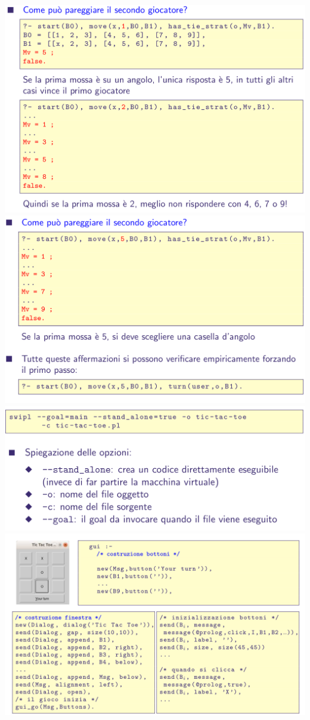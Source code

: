\documentclass[10pt]{article}
\begin{document}
\\
\includegraphics[scale=0.25]{Immagini/pl52.png}
\\
\includegraphics[scale=0.25]{Immagini/pl53.png}
\\
\includegraphics[scale=0.25]{Immagini/pl54.png}
\\
\includegraphics[scale=0.25]{Immagini/pl55.png}
\end{document}
